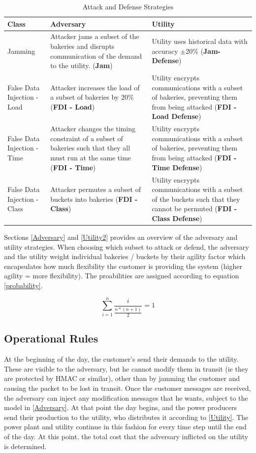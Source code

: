 \documentclass[conference]{IEEEtran}
\begin{document}
\begin{table}[!htbp]
\label{strategies}
\centering
\begin{tabular}{p{2cm} | p{3cm} | p{3cm}}
\toprule
Class & Adversary & Utility\\
\midrule
Jamming & Attacker jams a subset of the bakeries and disrupts communication of the demand to the utility. ({\bf Jam}) & Utility uses historical data with accuracy $\pm$20\%  ({\bf Jam-Defense})\\
False Data Injection - Load &  Attacker increases the load of a subset of bakeries by 20\% ({\bf FDI - Load}) & Utility encrypts communications with a subset of bakeries, preventing them from being attacked ({\bf FDI - Load Defense}) \\
False Data Injection - Time & Attacker changes the timing constraint of a subset of bakeries such that they all must run at the same time ({\bf FDI - Time}) & Utility encrypts communications with a subset of bakeries, preventing them from being attacked ({\bf FDI - Time Defense})\\
False Data Injection - Class & Attacker permutes a subset of buckets into bakeries ({\bf FDI - Class}) & Utility encrypts communications with a subset of the buckets such that they cannot be permuted ({\bf FDI - Class Defense})\\
\bottomrule
\end{tabular}
\caption{Attack and Defense Strategies}
\end{table}

Sections \ref{Adversary} and \ref{Utility2} provides an overview of the adversary and utility strategies.  When choosing which subset to attack or defend, the adversary and the utility weight individual bakeries / buckets by their agility factor \cite{petersen2013taxonomy} which encapsulates how much flexibility the customer
is providing the system (higher agility = more flexibility).  The proabilities are assigned according to equation \ref{probability}.

\begin{equation}
\label{probability}
\sum\limits_{i=1}^n \frac{i}{\frac{n*(n+1)}{2}} = 1
\end{equation}

\subsection{Operational Rules}
\label{Rules}

At the beginning of the day, the customer's send their demands to the utility. These are visible to the adversary, but he cannot modify them in transit (ie they are protected by HMAC or similar), other than by jamming the customer and causing the packet to be lost in transit.   Once the customer messages are received, the adversary can inject any modification messages that he wants, subject to the model in \ref{Adversary}. At that point the day begins, and the power producers send their production to the utility, who distributes it according to \ref{Utility}. The power plant and utility continue in this fashion for every time step until the end of the day. At this point, the total cost that the adversary inflicted
on the utility is determined.
\end{document}
